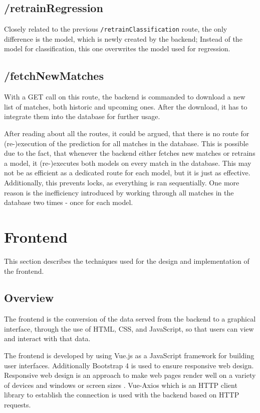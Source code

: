 \subsection{/retrainRegression}
Closely related to the previous \lstinline[columns=fixed]{/retrainClassification} route, the only difference is the model, which is newly created by the backend; Instead of the model for classification, this one overwrites the model used for regression.

\subsection{/fetchNewMatches}
With a GET call on this route, the backend is commanded to download a new list of matches, both historic and upcoming ones. After the download, it has to integrate them into the database for further usage.

After reading about all the routes, it could be argued, that there is no route for (re-)execution of the prediction for all matches in the database. This is possible due to the fact, that whenever the backend either fetches new matches or retrains a model, it (re-)executes both models on every match in the database. This may not be as efficient as a dedicated route for each model, but it is just as effective. Additionally, this prevents locks, as everything is ran sequentially. One more reason is the inefficiency introduced by working through all matches in the database two times - once for each model.


\section{Frontend}
This section describes the techniques used for the design and implementation of the frontend.
\subsection{Overview}
The frontend is the conversion of the data served from the backend to a graphical interface,
through the use of HTML, CSS, and JavaScript, so that users can view and interact with that data.

The frontend is developed by using Vue.js as a JavaScript framework for building user interfaces.
Additionally Bootstrap 4 is used to ensure responsive web design. Responsive web design is an approach to make web pages render well on a variety of devices and windows or screen sizes \cite{responsive:2011}. 
Vue-Axios which is an HTTP client library to establish the connection is used with the backend based on HTTP requests. 

